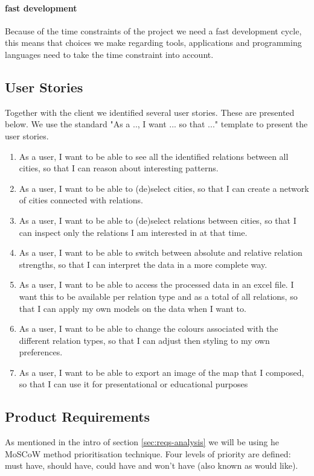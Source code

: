 \paragraph{fast development} Because of the time constraints of the project we need a fast development cycle, this means that choices we make regarding tools, applications and programming languages need to take the time constraint into account.

\subsection{User Stories}
Together with the client we identified several user stories. These are presented below. We use the standard "As a .., I want ... so that ..." template to present the user stories.
\begin{enumerate}
    \item As a user, I want to be able to see all the identified relations between all cities, so that I can reason about interesting patterns.
    \item As a user, I want to be able to (de)select cities, so that I can create a network of cities connected with relations.
    \item As a user, I want to be able to (de)select relations between cities, so that I can inspect only the relations I am interested in at that time.
    \item As a user, I want to be able to switch between absolute and relative relation strengths, so that I can interpret the data in a more complete way.
    \item As a user, I want to be able to access the processed data in an excel file. I want this to be available per relation type and as a total of all relations, so that I can apply my own models on the data when I want to.
    \item As a user, I want to be able to change the colours associated with the different relation types, so that I can adjust then styling to my own preferences.
    \item As a user, I want to be able to export an image of the map that I composed, so that I can use it for presentational or educational purposes
\end{enumerate}


\subsection{Product Requirements}\label{sec:reqs}
As mentioned in the intro of section \ref{sec:reqs-analysis} we will be using he MoSCoW method prioritisation technique. Four levels of priority are defined: must have, should have, could have and won't have (also known as would like).

